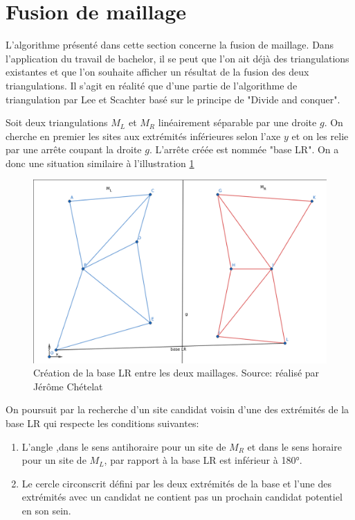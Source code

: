 \section{Fusion de maillage}

L'algorithme présenté dans cette section concerne la fusion de maillage. Dans l'application du travail de bachelor, il se peut que l'on ait déjà des triangulations existantes et que l'on souhaite afficher un résultat de la fusion des deux triangulations. Il s'agit en réalité que d'une partie de l'algorithme de triangulation par Lee et Scachter basé sur le principe de "Divide and conquer".


Soit deux triangulations $M_L$ et $M_R$ linéairement séparable par une droite $g$.
On cherche en premier les sites aux extrémités inférieures selon l'axe $y$ et on les relie par une arrête coupant la droite $g$.
L'arrête créée est nommée "base LR". On a donc une situation similaire à l'illustration \ref{fig:base_lr}

\begin{figure}[!htb]
    \centering
    \includegraphics[width=0.8\linewidth]{figures/base_lr.png}
    \caption{Création de la base LR entre les deux maillages. Source: réalisé par Jérôme Chételat}
    \label{fig:base_lr}
\end{figure}

On poursuit par la recherche d'un site candidat voisin d'une des extrémités de la base LR qui respecte les conditions suivantes:

\begin{enumerate}
    \item L'angle ,dans le sens antihoraire pour un site de $M_R$ et dans le sens horaire pour un site de $M_L$, par rapport à la base LR est inférieur à 180°.
    \item Le cercle circonscrit défini par les deux extrémités de la base et l'une des extrémités avec un candidat ne contient pas un prochain candidat potentiel en son sein.
\end{enumerate}

